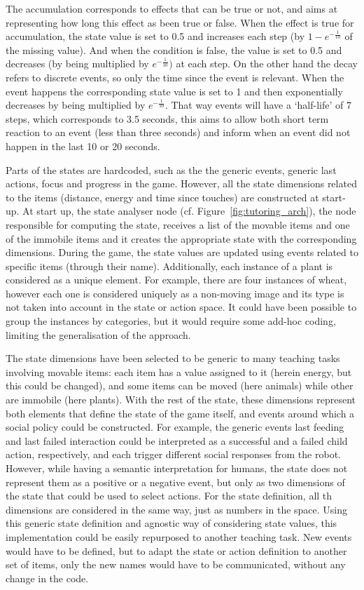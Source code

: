 The accumulation corresponds to effects that can be true or not, and aims at representing how long this effect as been true or false. When the effect is true for accumulation, the state value is set to 0.5 and increases each step (by $1-e^{-\frac{1}{10}}$ of the missing value). And when the condition is false, the value is set to 0.5 and decreases (by being multiplied by $e^{-\frac{1}{10}})$ at each step. On the other hand the decay refers to discrete events, so only the time since the event is relevant. When the event happens the corresponding state value is set to 1 and then exponentially decreases by being multiplied by $e^{-\frac{1}{10}}$. That way events will have a `half-life' of 7 steps, which corresponds to 3.5 seconds, this aims to allow both short term reaction to an event (less than three seconds) and inform when an event did not happen in the last 10 or 20 seconds.

Parts of the states are hardcoded, such as the the generic events, generic last actions, focus and progress in the game. However, all the state dimensions related to the items (distance, energy and time since touches) are constructed at start-up. At start up, the state analyser node (cf. Figure~\ref{fig:tutoring_arch}), the node responsible for computing the state, receives a list of the movable items and one of the immobile items and it creates the appropriate state with the corresponding dimensions. During the game, the state values are updated using events related to specific items (through their name). Additionally, each instance of a plant is considered as a unique element. For example, there are four instances of wheat, however each one is considered uniquely as a non-moving image and its type is not taken into account in the state or action space. It could have been possible to group the instances by categories, but it would require some add-hoc coding, limiting the generalisation of the approach. 

The state dimensions have been selected to be generic to many teaching tasks involving movable items: each item has a value assigned to it (herein energy, but this could be changed), and some items can be moved (here animals) while other are immobile (here plants). With the rest of the state, these dimensions represent both elements that define the state of the game itself, and events around which a social policy could be constructed. For example, the generic events last feeding and last failed interaction could be interpreted as a successful and a failed child action, respectively, and each trigger different social responses from the robot. However, while having a semantic interpretation for humans, the state does not represent them as a positive or a negative event, but only as two dimensions of the state that could be used to select actions. For the state definition, all th dimensions are considered in the same way, just as numbers in the space. Using this generic state definition and agnostic way of considering state values, this implementation could be easily repurposed to another teaching task. New events would have to be defined, but to adapt the state or action definition to another set of items, only the new names would have to be communicated, without any change in the code.

